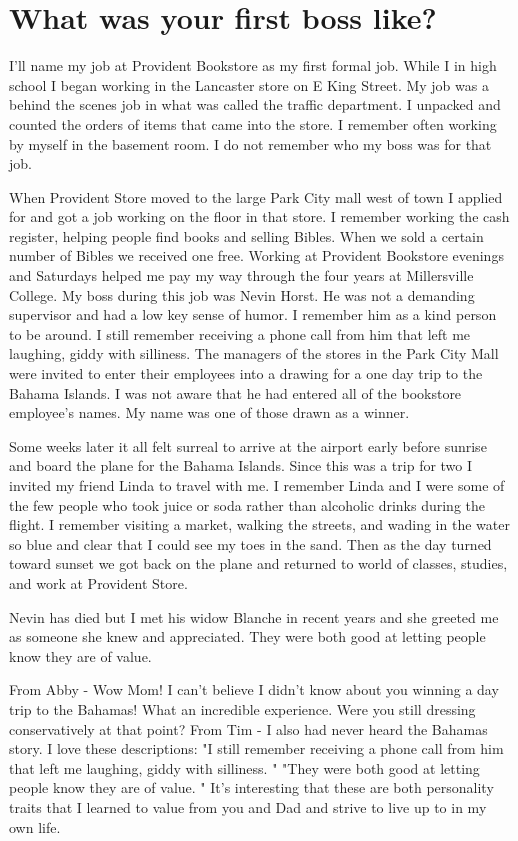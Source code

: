 \section{What was your first boss like?}
I'll name my job at Provident Bookstore as my first formal job.
While I in high school I began working in the Lancaster store on E King Street.
My job was a behind the scenes job in what was called the traffic department.
I unpacked and counted the orders of items that came into the store.
I remember often working by myself in the basement room.
I do not remember who my boss was for that job.

When Provident Store moved to the large Park City mall west of town I applied for and got a job working on the floor in that store.
I remember working the cash register, helping people find books and selling Bibles.
When we sold a certain number of Bibles we received one free.
Working at Provident Bookstore evenings and Saturdays helped me pay my way through the four years at Millersville College.
My boss during this job was Nevin Horst.
He was not a demanding supervisor and had a low key sense of humor.
I remember him as a kind person to be around.
I still remember receiving a phone call from him that left me laughing, giddy with silliness.
The managers of the stores in the Park City Mall were invited to enter their employees into a drawing for a one day trip to the Bahama Islands.
I was not aware that he had entered all of the bookstore employee's names.
My name was one of those drawn as a winner.

Some weeks later it all felt surreal to arrive at the airport early before sunrise and board the plane for the Bahama Islands.
Since this was a trip for two I invited my friend Linda to travel with me.
I remember Linda and I were some of the few people who took juice or soda rather than alcoholic drinks during the flight.
I remember visiting a market, walking the streets, and wading in the water so blue and clear that I could see my toes in the sand.
Then as the day turned toward sunset we got back on the plane and returned to world of classes, studies, and work at Provident Store.

Nevin has died but I met his widow Blanche in recent years and she greeted me as someone she knew and appreciated.
They were both good at letting people know they are of value.

From Abby - Wow Mom! I can't believe I didn't know about you winning a day trip to the Bahamas! What an incredible experience.
Were you still dressing conservatively at that point?
From Tim - I also had never heard the Bahamas story.
I love these descriptions:
"I still remember receiving a phone call from him that left me laughing, giddy with silliness.
"
"They were both good at letting people know they are of value.
"
It's interesting that these are both personality traits that I learned to value from you and Dad and strive to live up to in my own life.

